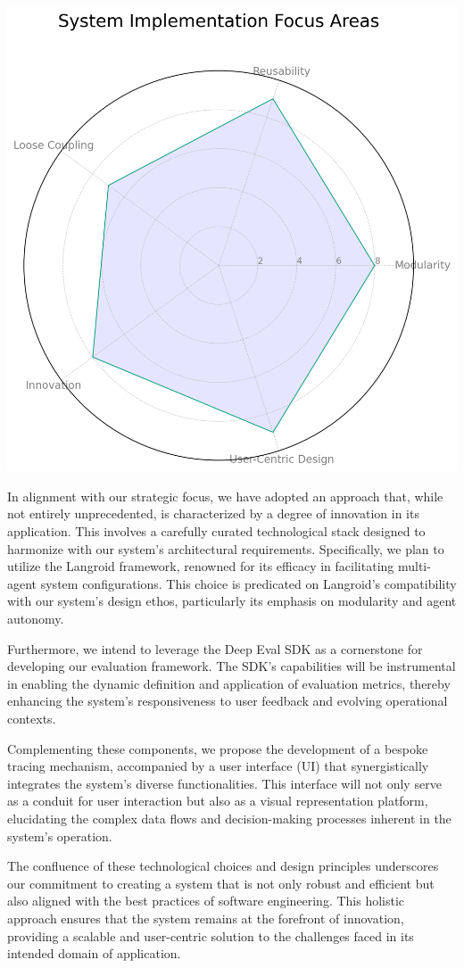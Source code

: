 \documentclass{article}
\begin{document}
\includegraphics[scale=0.5]{f789fce4-69a3-4e83-aec2-e23580880be8.png}


In alignment with our strategic focus, we have adopted an approach that, while not entirely unprecedented, is characterized by a degree of innovation in its application. This involves a carefully curated technological stack designed to harmonize with our system's architectural requirements. Specifically, we plan to utilize the Langroid framework, renowned for its efficacy in facilitating multi-agent system configurations. This choice is predicated on Langroid's compatibility with our system's design ethos, particularly its emphasis on modularity and agent autonomy.

Furthermore, we intend to leverage the Deep Eval SDK as a cornerstone for developing our evaluation framework. The SDK's capabilities will be instrumental in enabling the dynamic definition and application of evaluation metrics, thereby enhancing the system's responsiveness to user feedback and evolving operational contexts.

Complementing these components, we propose the development of a bespoke tracing mechanism, accompanied by a user interface (UI) that synergistically integrates the system's diverse functionalities. This interface will not only serve as a conduit for user interaction but also as a visual representation platform, elucidating the complex data flows and decision-making processes inherent in the system's operation.

The confluence of these technological choices and design principles underscores our commitment to creating a system that is not only robust and efficient but also aligned with the best practices of software engineering. This holistic approach ensures that the system remains at the forefront of innovation, providing a scalable and user-centric solution to the challenges faced in its intended domain of application.



\end{document}
